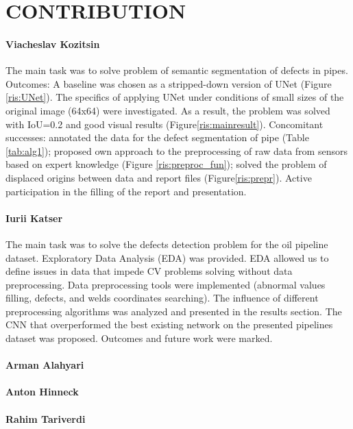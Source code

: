 \section{CONTRIBUTION}
\label{CONTRIBUTION}

\paragraph{Viacheslav Kozitsin}
The main task was to solve problem of semantic segmentation of defects in pipes.  Outcomes: A baseline was chosen as a stripped-down version of UNet (Figure \ref{ris:UNet}). The specifics of applying UNet under conditions of small sizes of the original image (64x64) were investigated. As a result, the problem was solved with IoU=0.2 and good visual results (Figure\ref{ris:mainresult}). Concomitant successes: annotated the data for the defect segmentation of pipe (Table \ref{tab:alg1}); proposed own approach to the preprocessing of raw data from sensors based on expert knowledge (Figure \ref{ris:preproc_fun}); solved the problem of displaced origins between data and report files (Figure\ref{ris:prepr}). Active participation in the filling of the report and presentation. 

\paragraph{Iurii Katser}
The main task was to solve the defects detection problem for the oil pipeline dataset.
Exploratory Data Analysis (EDA) was provided.
EDA allowed us to define issues in data that impede CV problems solving without data preprocessing.
Data preprocessing tools were implemented (abnormal values filling, defects, and welds coordinates searching).
The influence of different preprocessing algorithms was analyzed and presented in the results section.
The CNN that overperformed the best existing network on the presented pipelines dataset was proposed.
Outcomes and future work were marked.
	
\paragraph{Arman Alahyari}
	
\paragraph{Anton Hinneck}
	
\paragraph{Rahim Tariverdi}